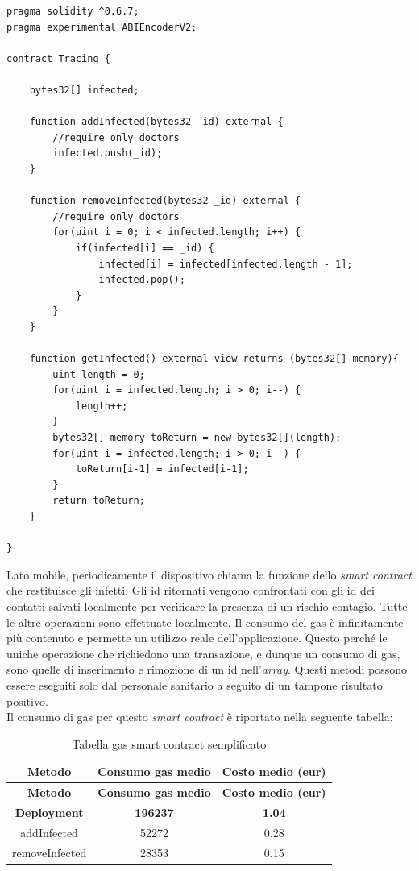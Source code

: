 \mbox{\newline}
\begin{lstlisting}[language = Solidity]
pragma solidity ^0.6.7;
pragma experimental ABIEncoderV2;

contract Tracing {

    bytes32[] infected;
    
    function addInfected(bytes32 _id) external {
        //require only doctors
        infected.push(_id);
    }

    function removeInfected(bytes32 _id) external {
        //require only doctors
        for(uint i = 0; i < infected.length; i++) {
            if(infected[i] == _id) {
                infected[i] = infected[infected.length - 1];
                infected.pop();
            }
        }
    }  
    
    function getInfected() external view returns (bytes32[] memory){   
        uint length = 0;
        for(uint i = infected.length; i > 0; i--) {
            length++;
        }
        bytes32[] memory toReturn = new bytes32[](length);
        for(uint i = infected.length; i > 0; i--) {
            toReturn[i-1] = infected[i-1]; 
        }
        return toReturn;
    }
   
}
\end{lstlisting}
\mbox{\newline}

Lato mobile, periodicamente il dispositivo chiama la funzione dello \textit{smart contract} che restituisce gli infetti. Gli id ritornati vengono confrontati con gli id dei contatti salvati localmente per verificare la presenza di un rischio contagio.
Tutte le altre operazioni sono effettuate localmente. Il consumo del gas è infinitamente più contenuto e permette un utilizzo reale dell’applicazione. Questo perché le uniche operazione che richiedono una transazione, e dunque un consumo di gas, sono quelle di inserimento e rimozione di un id nell’\textit{array}. Questi metodi possono essere eseguiti solo dal personale sanitario a seguito di un tampone risultato positivo. \\
Il consumo di gas per questo \textit{smart contract} è riportato nella seguente tabella:
\begin{center}
	\begin{longtable}{| c | c | c |}
		\caption{Tabella gas smart contract semplificato}
		\label{tab:gas-simplytracing}\\
		\hline
		\textbf{Metodo} & \textbf{Consumo gas medio} & \textbf{Costo medio (eur)}\\
		\endfirsthead
		\hline
		\textbf{Metodo} & \textbf{Consumo gas medio} & \textbf{Costo medio (eur)}\\
		\endhead
		\textbf{Deployment} & \textbf{196237} & \textbf{1.04}\\
		\hline
		\endfoot
		
		\hline
		addInfected & 52272 & 0.28\\
		\hline
		removeInfected & 28353 & 0.15\\
		\hline
	\end{longtable}
\end{center}

